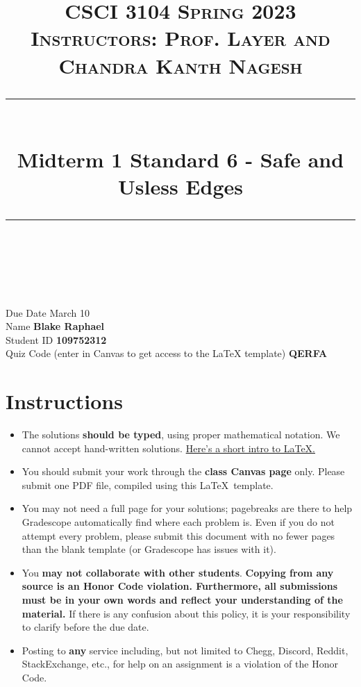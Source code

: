 \documentclass[11pt]{article}
\title{
\normalfont \normalsize 
\textsc{CSCI 3104 Spring 2023 \\
Instructors: Prof. Layer and Chandra Kanth Nagesh} \\
[10pt] 
\rule{\linewidth}{0.5pt} \\[6pt] 
\huge Midterm 1 Standard 6 - Safe and Usless Edges  \\
\rule{\linewidth}{2pt}  \\[10pt]
}
\date{}
\theoremstyle{definition}
\theoremstyle{definition}
\theoremstyle{definition}
\begin{document}
\maketitle


\noindent
Due Date \dotfill March 10 \\
Name \dotfill \textbf{Blake Raphael} \\
Student ID \dotfill \textbf{109752312} \\
Quiz Code (enter in Canvas to get access to the LaTeX template) \dotfill \textbf{QERFA} \\

\tableofcontents

\section{Instructions}
 \begin{itemize}
	\item The solutions \textbf{should be typed}, using proper mathematical notation. We cannot accept hand-written solutions. \href{http://ece.uprm.edu/~caceros/latex/introduction.pdf}{Here's a short intro to \LaTeX.}
	\item You should submit your work through the \textbf{class Canvas page} only. Please submit one PDF file, compiled using this \LaTeX \ template.
	\item You may not need a full page for your solutions; pagebreaks are there to help Gradescope automatically find where each problem is. Even if you do not attempt every problem, please submit this document with no fewer pages than the blank template (or Gradescope has issues with it).

	\item You \textbf{may not collaborate with other students}. \textbf{Copying from any source is an Honor Code violation. Furthermore, all submissions must be in your own words and reflect your understanding of the material.} If there is any confusion about this policy, it is your responsibility to clarify before the due date. 

	\item Posting to \textbf{any} service including, but not limited to Chegg, Discord, Reddit, StackExchange, etc., for help on an assignment is a violation of the Honor Code.

	\end{itemize}
\end{document}
